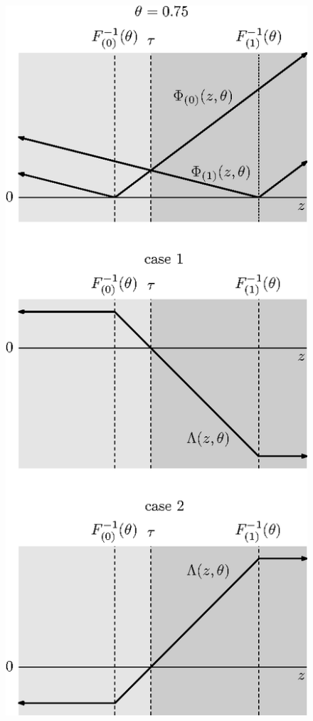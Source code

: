 \begin{figure}[p]
\begin{minipage}[t]{0.49\linewidth}
    \centering
    \includegraphics{phi-lambda-0-75}
  \end{minipage}
  
\end{figure}

